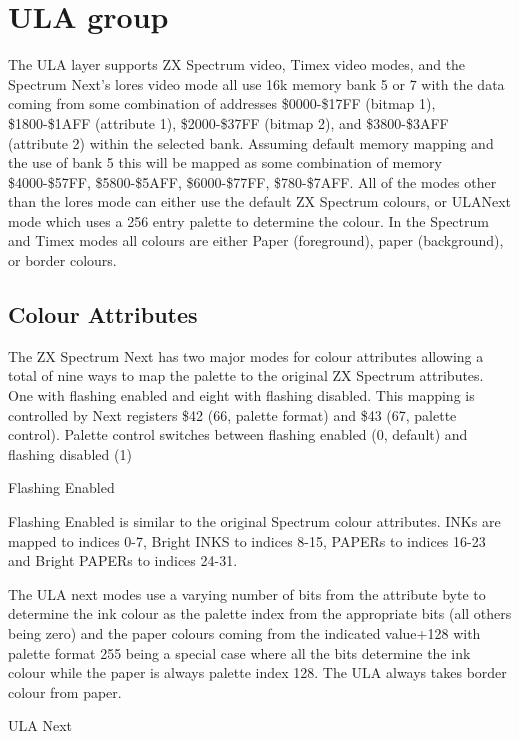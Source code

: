 \section{ULA group}
The ULA layer supports ZX Spectrum video, Timex video modes, and the
Spectrum Next’s lores video mode all use 16k memory bank 5 or 7 with
the data coming from some combination of addresses \$0000-\$17FF
(bitmap 1), \$1800-\$1AFF (attribute 1), \$2000-\$37FF (bitmap 2), and
\$3800-\$3AFF (attribute 2) within the selected bank.  Assuming
default memory mapping and the use of bank 5 this will be mapped as
some combination of memory \$4000-\$57FF, \$5800-\$5AFF,
\$6000-\$77FF, \$780-\$7AFF. All of the modes other than the lores
mode can either use the default ZX Spectrum colours, or ULANext mode
which uses a 256 entry palette to determine the colour. In the
Spectrum and Timex modes all colours are either Paper (foreground),
paper (background), or border colours.

\subsection{Colour Attributes}
The ZX Spectrum Next has two major modes for colour attributes
allowing a total of nine ways to map the palette to the original ZX
Spectrum attributes. One with flashing enabled and eight with flashing
disabled. This mapping is controlled by Next registers \$42 (66,
palette format) and \$43 (67, palette control).  Palette control
switches between flashing enabled (0, default) and flashing disabled
(1)

\begin{table}[h]\centering
  \caption{Flashing Enabled}
\end{table}

Flashing Enabled is similar to the original Spectrum colour
attributes. INKs are mapped to indices 0-7, Bright INKS to indices
8-15, PAPERs to indices 16-23 and Bright PAPERs to indices 24-31.

The ULA next modes use a varying number of bits from the attribute
byte to determine the ink colour as the palette index from the
appropriate bits (all others being zero) and the paper colours coming
from the indicated value+128 with palette format 255 being a special
case where all the bits determine the ink colour while the paper is
always palette index 128. The ULA always takes border colour from paper.

\begin{table}[h]\centering
  \caption{ULA Next}
\end{table}

